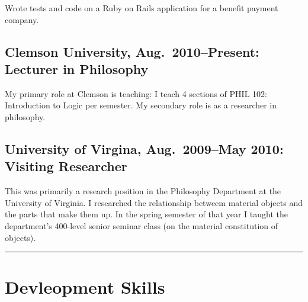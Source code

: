 \documentclass{article}
\begin{document}
  \hspace{2em}Wrote tests and code on a Ruby on Rails application for a benefit 
  payment company.
  
  \subsection{Clemson University, Aug.\ 2010--Present: Lecturer in 
  Philosophy}
  \label{sub:clemson}

  \hspace{2em}My primary role at Clemson is teaching: I teach 4 sections of PHIL 
  102: Introduction to Logic per semester.  My secondary role is as a 
  researcher in philosophy.

  \subsection{University of Virgina, Aug.\ 2009--May 2010: Visiting 
  Researcher}
  \label{sub:uva}

  \hspace{2em}This was primarily a research position in the Philosophy Department 
  at the University of Virginia.  I researched the relationship 
  betweem material objects and the parts that make them up.  In the 
  spring semester of that year I taught the department's 400-level 
  senior seminar class (on the material constitution of objects).
  

  \vspace{1em}

\hrule
\section{Devleopment Skills} %
\label{sec:Devleopment Skills}
\end{document}
